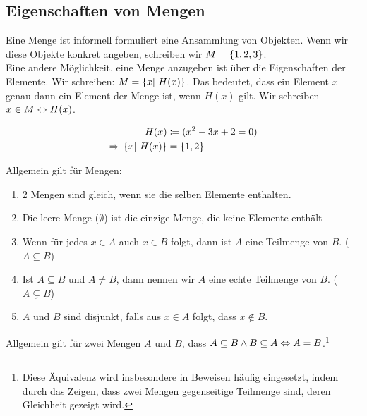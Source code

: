 \thispagestyle{pagenumberonly}

\subsection{Eigenschaften von Mengen}

\begin{notation}
    Eine Menge ist informell formuliert eine Ansammlung von Objekten.
    Wenn wir diese Objekte konkret angeben, schreiben wir $M = \left\{1, 2, 3\right\}$.\\
    Eine andere Möglichkeit, eine Menge anzugeben ist über die Eigenschaften der Elemente.
    Wir schreiben: $M=\left\{x|~H(x)\right\}$. Das bedeutet, dass ein Element $x$ genau dann ein Element der Menge ist, wenn $H(x)$ gilt.
    Wir schreiben $x\in M \Leftrightarrow{} H(x)$.
\end{notation}

\begin{beispiel}
    \begin{align*}
        H(x) &\coloneqq (x^2-3x+2 = 0)\\
        \Rightarrow{} \left\{x|~H(x)\right\} &= \left\{1,2\right\}
    \end{align*}
\end{beispiel}

\begin{definition}
    Allgemein gilt für Mengen:
    \theoremescape
    \begin{enumerate}
        \item 2 Mengen sind gleich, wenn sie die selben Elemente enthalten.
        \item Die leere Menge ($\emptyset$) ist die einzige Menge, die keine Elemente enthält
        \item Wenn für jedes $x\in A$ auch $x\in B$ folgt, dann ist $A$ eine Teilmenge von $B$. ($A\subseteq B$)
        \item Ist $A\subseteq B$ und $A\neq B$, dann nennen wir $A$ eine echte Teilmenge von $B$. ($A\subsetneq B$)
        \item $A$ und $B$ sind disjunkt, falls aus $x\in A$ folgt, dass $x\not\in B$.
    \end{enumerate}
\end{definition}

\begin{bemerkung}
    Allgemein gilt für zwei Mengen $A$ und $B$, dass $A\subseteq B \land B\subseteq A \Leftrightarrow{} A = B$.\footnote{Diese Äquivalenz wird insbesondere in Beweisen häufig eingesetzt, indem durch das Zeigen, dass zwei Mengen gegenseitige Teilmenge sind, deren Gleichheit gezeigt wird.}
\end{bemerkung}

